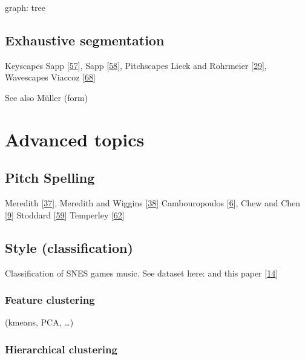 \documentclass[letterpaper,10pt,english]{sphinxmanual}
\begin{document}
\sphinxAtStartPar
graph: tree


\section{Exhaustive segmentation}
\label{\detokenize{5_segmentation:exhaustive-segmentation}}
\sphinxAtStartPar
Keyscapes Sapp {[}\hyperlink{cite.8_bibliography:id41}{57}{]}, Sapp {[}\hyperlink{cite.8_bibliography:id42}{58}{]},
Pitchscapes Lieck and Rohrmeier {[}\hyperlink{cite.8_bibliography:id33}{29}{]},
Wavescapes Viaccoz  {[}\hyperlink{cite.8_bibliography:id55}{68}{]}

\sphinxAtStartPar
See also Müller (form)


\chapter{Advanced topics}
\label{\detokenize{6_advanced:advanced-topics}}\label{\detokenize{6_advanced::doc}}

\section{Pitch Spelling}
\label{\detokenize{6_advanced:pitch-spelling}}\label{\detokenize{6_advanced:id1}}
\sphinxAtStartPar
Meredith {[}\hyperlink{cite.8_bibliography:id27}{37}{]}, Meredith and Wiggins {[}\hyperlink{cite.8_bibliography:id26}{38}{]}
Cambouropoulos {[}\hyperlink{cite.8_bibliography:id28}{6}{]}, Chew and Chen {[}\hyperlink{cite.8_bibliography:id29}{9}{]}
Stoddard  {[}\hyperlink{cite.8_bibliography:id30}{59}{]}
Temperley {[}\hyperlink{cite.8_bibliography:id31}{62}{]}


\section{Style (classification)}
\label{\detokenize{6_advanced:style-classification}}
\sphinxAtStartPar
Classification of SNES games music. See dataset here: 
and this paper {[}\hyperlink{cite.8_bibliography:id36}{14}{]}


\subsection{Feature clustering}
\label{\detokenize{6_advanced:feature-clustering}}
\sphinxAtStartPar
(k\sphinxhyphen{}means, PCA, …)


\subsection{Hierarchical clustering}
\label{\detokenize{6_advanced:hierarchical-clustering}}
\end{document}
